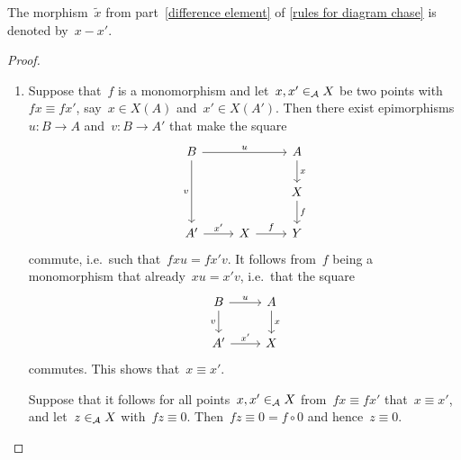 \begin{notationnonum}
  \label{notation for difference}
  The morphism~$\tilde{x}$ from part~\ref*{difference element} of \cref{rules for diagram chase} is denoted by~$x - x'$.
\end{notationnonum}


\begin{proof}
  \leavevmode
  \begin{enumerate}
    \item
      Suppose that~$f$ is a monomorphism and let~$x, x' \in_{\mathcal{A}} X$ be two points with~$fx \equiv fx'$, say~$x \in X(A)$ and~$x' \in X(A')$.
      Then there exist epimorphisms~$u \colon B \to A$ and~$v \colon B \to A'$ that make the square
      \[
        \begin{tikzcd}
            B
            \arrow{rr}[above]{u}
            \arrow{dd}[left]{v}
          & {}
          & A
            \arrow{d}[right]{x}
          \\
            {}
          & {}
          & X
            \arrow{d}[right]{f}
          \\
            A'
            \arrow{r}[above]{x'}
          & X
            \arrow{r}[above]{f}
          & Y
        \end{tikzcd}
      \]
      commute, i.e.\ such that~$f x u = f x' v$.
      It follows from~$f$ being a monomorphism that already~$x u = x' v$, i.e.\ that the square
      \[
        \begin{tikzcd}
            B
            \arrow{r}[above]{u}
            \arrow{d}[left]{v}
          & A
            \arrow{d}[right]{x}
          \\
            A'
            \arrow{r}[above]{x'}
          & X
        \end{tikzcd}
      \]
      commutes.
      This shows that~$x \equiv x'$.
      
      Suppose that it follows for all points~$x, x' \in_{\mathcal{A}} X$ from~$f x \equiv f x'$ that~$x \equiv x'$, and let~$z \in_{\mathcal{A}} X$ with~$f z \equiv 0$.
      Then~$fz \equiv 0 = f \circ 0$ and hence~$z \equiv 0$.
      

\end{enumerate}
\end{proof}
